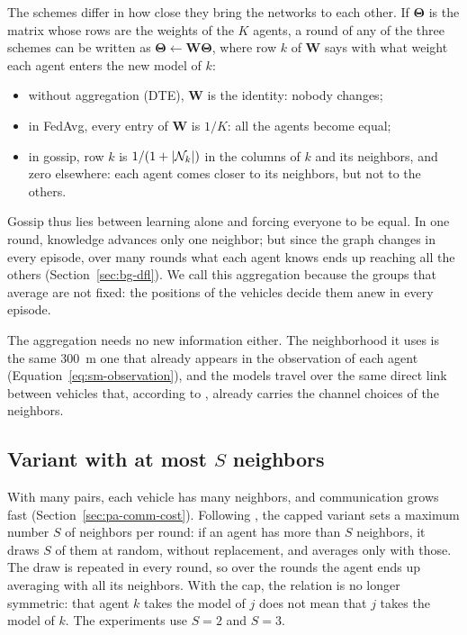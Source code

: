 The schemes differ in how close they bring the networks to each other. If $\bm{\Theta}$ is the matrix whose
rows are the weights of the $K$ agents, a round of any of the three schemes can be written as
$\bm{\Theta} \leftarrow \bm{W} \bm{\Theta}$, where row $k$ of $\bm{W}$ says with what weight each agent enters
the new model of $k$:
\begin{itemize}[nosep]
  \item without aggregation (\ac{DTE}), $\bm{W}$ is the identity: nobody changes;
  \item in \ac{FedAvg}, every entry of $\bm{W}$ is $1/K$: all the agents become equal;
  \item in gossip, row $k$ is $1/(1 + |\mathcal{N}_k|)$ in the columns of $k$ and its neighbors, and zero
    elsewhere: each agent comes closer to its neighbors, but not to the others.
\end{itemize}
Gossip thus lies between learning alone and forcing everyone to be equal. In one round, knowledge advances
only one neighbor; but since the graph changes in every episode, over many rounds what each agent knows ends
up reaching all the others (Section~\ref{sec:bg-dfl}). We call this aggregation  because the
groups that average are not fixed: the positions of the vehicles decide them anew in every episode.

The aggregation needs no new information either. The neighborhood it uses is the same \SI{300}{\meter} one
that already appears in the observation of each agent (Equation~\ref{eq:sm-observation}), and the models
travel over the same direct link between vehicles that, according to \citet{li+22fedmarl}, already carries
the channel choices of the neighbors.

\subsection{Variant with at most \texorpdfstring{$S$}{S} neighbors}
\label{sec:pa-gossip-s}

With many pairs, each vehicle has many neighbors, and communication grows fast (Section~\ref{sec:pa-comm-cost}).
Following \citet{ge+24dfl}, the capped variant sets a maximum number $S$ of neighbors per round: if an agent
has more than $S$ neighbors, it draws $S$ of them at random, without replacement, and averages only with
those. The draw is repeated in every round, so over the rounds the agent ends up averaging with all its
neighbors. With the cap, the relation is no longer symmetric: that agent $k$ takes the model of $j$ does not
mean that $j$ takes the model of $k$. The experiments use $S = 2$ and $S = 3$.

